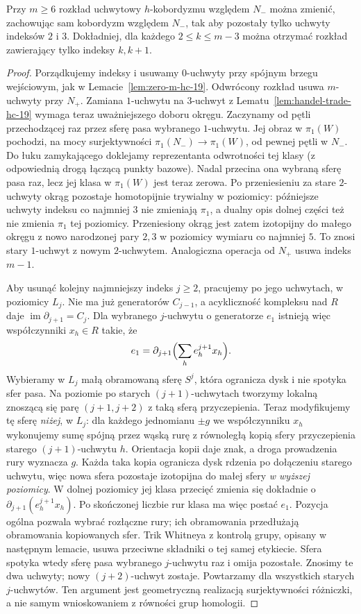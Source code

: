 \begin{lemat}
\label{lem:postac-normalna-20}
Przy $m\geq6$ rozkład uchwytowy $h$-kobordyzmu
względem $N_-$ można zmienić, zachowując sam
kobordyzm względem $N_-$, tak aby pozostały tylko
uchwyty indeksów $2$ i $3$. Dokładniej, dla każdego
$2\leq k\leq m-3$ można otrzymać rozkład zawierający
tylko indeksy $k,k+1$.
\end{lemat}
\begin{proof}
Porządkujemy indeksy i usuwamy $0$-uchwyty przy
spójnym brzegu wejściowym, jak w
Lemacie~\ref{lem:zero-m-hc-19}. Odwrócony rozkład
usuwa $m$-uchwyty przy $N_+$. Zamiana $1$-uchwytu
na $3$-uchwyt z
Lematu~\ref{lem:handel-trade-hc-19} wymaga teraz
uważniejszego doboru okręgu. Zaczynamy od pętli
przechodzącej raz przez sferę pasa wybranego
$1$-uchwytu. Jej obraz w $\pi_1(W)$ pochodzi,
na mocy surjektywności $\pi_1(N_-)\to\pi_1(W)$,
od pewnej pętli w $N_-$. Do łuku zamykającego
doklejamy reprezentanta odwrotności tej klasy
(z odpowiednią drogą łączącą punkty bazowe).
Nadal przecina ona wybraną sferę pasa raz,
lecz jej klasa w $\pi_1(W)$ jest teraz zerowa.
Po przeniesieniu za stare $2$-uchwyty okrąg
pozostaje homotopijnie trywialny w poziomicy:
późniejsze uchwyty indeksu co najmniej $3$
nie zmieniają $\pi_1$, a dualny opis dolnej
części też nie zmienia $\pi_1$ tej poziomicy.
Przeniesiony okrąg jest zatem izotopijny
do małego okręgu z nowo narodzonej pary $2,3$
w poziomicy wymiaru co najmniej $5$.
To znosi stary $1$-uchwyt z nowym $2$-uchwytem.
Analogiczna operacja od $N_+$ usuwa indeks $m-1$.

Aby usunąć kolejny najmniejszy indeks $j\geq2$,
pracujemy po jego uchwytach, w poziomicy $L_j$.
Nie ma już generatorów $C_{j-1}$, a acykliczność
kompleksu nad $R$ daje
$\operatorname{im}\partial_{j+1}=C_j$.
Dla wybranego $j$-uchwytu o generatorze $e_1$
istnieją więc współczynniki $x_h\in R$ takie, że
\[
 e_1=\partial_{j+1}\Bigl(\sum_h e_h^{j+1}x_h\Bigr).
\]
Wybieramy w $L_j$ małą obramowaną sferę $S^j$,
która ogranicza dysk i nie spotyka sfer pasa.
Na poziomie po starych $(j+1)$-uchwytach
tworzymy lokalną znoszącą się parę
$(j+1,j+2)$ z taką sferą przyczepienia.
Teraz modyfikujemy tę sferę \emph{niżej},
w $L_j$: dla każdego jednomianu $\pm g$
we współczynniku $x_h$ wykonujemy sumę
spójną przez wąską rurę z równoległą kopią
sfery przyczepienia starego $(j+1)$-uchwytu
$h$. Orientacja kopii daje znak, a droga
prowadzenia rury wyznacza $g$.
Każda taka kopia ogranicza dysk rdzenia
po dołączeniu starego uchwytu, więc nowa
sfera pozostaje izotopijna do małej sfery
\emph{w wyższej poziomicy}. W dolnej poziomicy
jej klasa przecięć zmienia się dokładnie o
$\partial_{j+1}(e_h^{j+1}x_h)$.
Po skończonej liczbie rur klasa ma więc
postać $e_1$. Pozycja ogólna pozwala wybrać
rozłączne rury; ich obramowania przedłużają
obramowania kopiowanych sfer.
Trik Whitneya z kontrolą grupy, opisany
w następnym lemacie, usuwa przeciwne składniki
o tej samej etykiecie. Sfera spotyka wtedy
sferę pasa wybranego $j$-uchwytu raz i omija
pozostałe. Znosimy te dwa uchwyty;
nowy $(j+2)$-uchwyt zostaje.
Powtarzamy dla wszystkich starych
$j$-uchwytów. Ten argument jest geometryczną
realizacją surjektywności różniczki, a nie
samym wnioskowaniem z równości grup homologii.


\end{proof}
